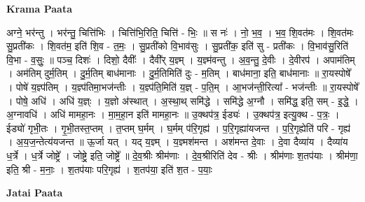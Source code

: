 \documentclass[17pt]{extarticle}
\begin{document}
\textbf{Krama Paata} \newline

अग्ने॒ भर॑न्तु । भर॑न्तु॒ चित्ति॑भिः । चित्ति॑भि॒रिति॒ चित्ति॑ - भिः॒ ॥ स नः॑ । नो॒ भ॒व॒ । भ॒व॒ शि॒वत॑मः । शि॒वत॑मः सु॒प्रती॑कः । शि॒वत॑म॒ इति॑ शि॒व - त॒मः॒ । सु॒प्रती॑को वि॒भाव॑सुः । सु॒प्रती॑क॒ इति॑ सु - प्रती॑कः । वि॒भाव॑सु॒रिति॑ वि॒भा - व॒सुः॒ ॥ पञ्च॒ दिशः॑ । दिशो॒ दैवीः᳚ । दैवी᳚र् य॒ज्ञ्म् । य॒ज्ञ्म॑वन्तु । अ॒व॒न्तु॒ दे॒वीः । दे॒वीरप॑ । अपाम॑तिम् । अम॑तिम् दुर्म॒तिम् । दु॒र्म॒तिम् बाध॑मानाः । दु॒र्म॒तिमिति॑ दुः - म॒तिम् । बाध॑माना॒ इति॒ बाध॑मानाः ॥ रा॒यस्पोषे᳚ । पोषे॑ य॒ज्ञ्प॑तिम् । य॒ज्ञ्प॑तिमा॒भज॑न्तीः । य॒ज्ञ्प॑ति॒मिति॑ य॒ज्ञ् - प॒ति॒म् । आ॒भज॑न्ती॒रित्या᳚ - भज॑न्तीः ॥ रा॒यस्पोषे᳚ । पोषे॒ अधि॑ । अधि॑ य॒ज्ञ्ः । य॒ज्ञो अ॑स्थात् । अ॒स्था॒थ् समि॑द्धे । समि॑द्धे अ॒ग्नौ । समि॑द्ध॒ इति॒ सम् - इ॒द्धे॒ । अ॒ग्नावधि॑ । अधि॑ मामहा॒नः । मा॒म॒हा॒न इति॑ मामहा॒नः ॥ उ॒क्थप॑त्र॒ ईड्यः॑ । उ॒क्थप॑त्र॒ इत्यु॒क्थ - प॒त्रः॒ । ईड्यो॑ गृभी॒तः । गृ॒भी॒तस्त॒प्तम् । त॒प्तम् घ॒र्मम् । घ॒र्मम् प॑रि॒गृह्य॑ । प॒रि॒गृह्या॑यजन्त । प॒रि॒गृह्येति॑ परि - गृह्य॑ । अ॒य॒ज॒न्तेत्य॑यजन्त ॥ ऊ॒र्जा यत् । यद् य॒ज्ञ्म् । य॒ज्ञ्मश॑मन्त । अश॑मन्त दे॒वाः । दे॒वा दैव्या॑य । दैव्या॑य ध॒र्त्रे । ध॒र्त्रे जोष्ट्रे᳚ । जोष्ट्रे॒ इति॒ जोष्ट्रे᳚ ॥ दे॒व॒श्रीः श्रीम॑णाः । दे॒व॒श्रीरिति॑ देव - श्रीः । श्रीम॑णाः श॒तप॑याः । श्रीम॑णा॒ इति॒ श्री - म॒नाः॒ । श॒तप॑याः परि॒गृह्य॑ । श॒तप॑या॒ इति॑ श॒त - प॒याः॒ \newline

\textbf{Jatai Paata} \newline
\end{document}
